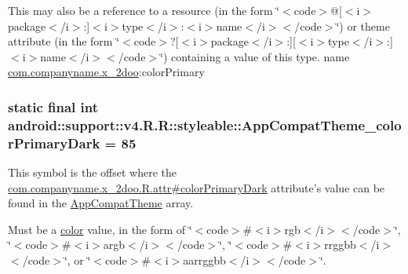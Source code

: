 This may also be a reference to a resource (in the form \char`\"{}$<$code$>$@\mbox{[}$<$i$>$package$<$/i$>$:\mbox{]}$<$i$>$type$<$/i$>$:$<$i$>$name$<$/i$>$$<$/code$>$\char`\"{}) or theme attribute (in the form \char`\"{}$<$code$>$?\mbox{[}$<$i$>$package$<$/i$>$:\mbox{]}\mbox{[}$<$i$>$type$<$/i$>$:\mbox{]}$<$i$>$name$<$/i$>$$<$/code$>$\char`\"{}) containing a value of this type.  name \hyperlink{namespacecom_1_1companyname_1_1x__2doo}{com.companyname.x\_\-2doo}:colorPrimary \hypertarget{classandroid_1_1support_1_1v4_1_1_r_1_1styleable_d4bbe6369273502bd320159d8f9742fb}{
\subsubsection[{AppCompatTheme\_\-colorPrimaryDark}]{\setlength{\rightskip}{0pt plus 5cm}static final int android::support::v4.R.R::styleable::AppCompatTheme\_\-colorPrimaryDark = 85}}
\label{classandroid_1_1support_1_1v4_1_1_r_1_1styleable_d4bbe6369273502bd320159d8f9742fb}


This symbol is the offset where the \hyperlink{classcom_1_1companyname_1_1x__2doo_1_1_r_1_1attr_85b6ea9e574ea4e25b8964f00757ccd2}{com.companyname.x\_\-2doo.R.attr\#colorPrimaryDark} attribute's value can be found in the \hyperlink{classandroid_1_1support_1_1v4_1_1_r_1_1styleable_0873e92ba21076bb5a4aeadeb7f5779f}{AppCompatTheme} array.

Must be a \hyperlink{classandroid_1_1support_1_1v4_1_1_r_1_1color}{color} value, in the form of \char`\"{}$<$code$>$\#$<$i$>$rgb$<$/i$>$$<$/code$>$\char`\"{}, \char`\"{}$<$code$>$\#$<$i$>$argb$<$/i$>$$<$/code$>$\char`\"{}, \char`\"{}$<$code$>$\#$<$i$>$rrggbb$<$/i$>$$<$/code$>$\char`\"{}, or \char`\"{}$<$code$>$\#$<$i$>$aarrggbb$<$/i$>$$<$/code$>$\char`\"{}. 

